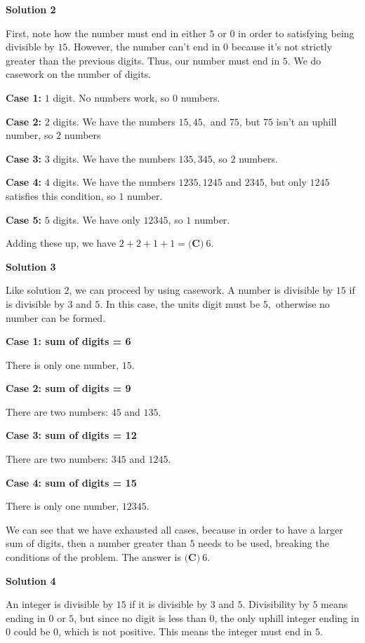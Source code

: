 \begin{enumerate}
\textbf{Solution 2}

First, note how the number must end in either $5$ or $0$ in order to satisfying being divisible by $15$. However, the number can't end in $0$ because it's not strictly greater than the previous digits. Thus, our number must end in $5$. We do casework on the number of digits.

 \textbf{Case 1:} $1$ digit. No numbers work, so $0$ numbers.

 \textbf{Case 2:} $2$ digits. We have the numbers $15, 45,$ and $75$, but $75$ isn't an uphill number, so $2$ numbers

 \textbf{Case 3:} $3$ digits. We have the numbers $135, 345$, so $2$ numbers.

 \textbf{Case 4:} $4$ digits. We have the numbers $1235, 1245$ and $2345$, but only $1245$ satisfies this condition, so $1$ number.

 \textbf{Case 5:} $5$ digits. We have only $12345$, so $1$ number.

 Adding these up, we have $2+2+1+1=\boxed{\textbf{(C)} ~6}$.

 



\textbf{Solution 3}

Like solution 2, we can proceed by using casework. A number is divisible by $15$ if is divisible by $3$ and $5.$ In this case, the units digit must be $5,$ otherwise no number can be formed.

 \textbf{Case 1: sum of digits = 6}

 There is only one number, $15.$

 \textbf{Case 2: sum of digits = 9}

 There are two numbers: $45$ and $135.$

 \textbf{Case 3: sum of digits = 12}

 There are two numbers: $345$ and $1245.$

 \textbf{Case 4: sum of digits = 15}

 There is only one number, $12345.$

 We can see that we have exhausted all cases, because in order to have a larger sum of digits, then a number greater than $5$ needs to be used, breaking the conditions of the problem. The answer is $\boxed{\textbf{(C)} ~6}.$




\textbf{Solution 4}

An integer is divisible by $15$ if it is divisible by $3$ and $5$. Divisibility by $5$ means ending in $0$ or $5$, but since no digit is less than $0$, the only uphill integer ending in $0$ could be $0$, which is not positive. This means the integer must end in $5$.


\end{enumerate}
